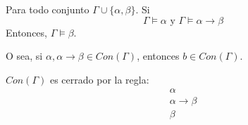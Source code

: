 \begin{prop}
    Para todo conjunto $\Gamma\cup\{\alpha,\beta\}$. Si
    \begin{equation*}
        \Gamma\vDash\alpha \text{\ y\ } \Gamma\vDash\alpha\rightarrow\beta
    \end{equation*}
    Entonces, $\Gamma\vDash\beta$.

    O sea, si $\alpha,\alpha\rightarrow\beta\in Con(\Gamma)$, entonces $b\in Con(\Gamma)$.

    $Con(\Gamma)$ es cerrado por la regla:
    \begin{equation*}
        \begin{array}{c}
            \alpha \\
            \alpha\rightarrow\beta \\
            \hline
            \beta
        \end{array}
    \end{equation*}
\end{prop}


